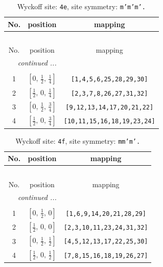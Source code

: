 \documentclass[fleqn,8pt]{jsarticle}
\begin{document}
\begin{longtable}{ccc}
\caption{Wyckoff site: {\tt 4e}, site symmetry: {\tt m'm'm'.}}
 \\
 \hline \hline
No. & position & mapping \\ \hline \endfirsthead

\multicolumn{2}{l}{\tablename\ \thetable{}} \\
 \hline \hline
No. & position & mapping \\ \hline \endhead

 \hline \hline
\multicolumn{2}{r}{\footnotesize\it continued ...} \\ \endfoot

 \hline \hline
\multicolumn{2}{r}{} \\ \endlastfoot

1 & $\left[ 0,\, \frac{1}{2},\, \frac{1}{4} \right]$ & {\tt [1,4,5,6,25,28,29,30]} \\ \hline
2 & $\left[ \frac{1}{2},\, 0,\, \frac{1}{4} \right]$ & {\tt [2,3,7,8,26,27,31,32]} \\ \hline
3 & $\left[ 0,\, \frac{1}{2},\, \frac{3}{4} \right]$ & {\tt [9,12,13,14,17,20,21,22]} \\ \hline
4 & $\left[ \frac{1}{2},\, 0,\, \frac{3}{4} \right]$ & {\tt [10,11,15,16,18,19,23,24]} \\
\end{longtable}
\renewcommand{\arraystretch}{1.2}
\begin{longtable}{ccc}
\caption{Wyckoff site: {\tt 4f}, site symmetry: {\tt mm'm'.}}
 \\
 \hline \hline
No. & position & mapping \\ \hline \endfirsthead

\multicolumn{2}{l}{\tablename\ \thetable{}} \\
 \hline \hline
No. & position & mapping \\ \hline \endhead

 \hline \hline
\multicolumn{2}{r}{\footnotesize\it continued ...} \\ \endfoot

 \hline \hline
\multicolumn{2}{r}{} \\ \endlastfoot

1 & $\left[ 0,\, \frac{1}{2},\, 0 \right]$ & {\tt [1,6,9,14,20,21,28,29]} \\ \hline
2 & $\left[ \frac{1}{2},\, 0,\, 0 \right]$ & {\tt [2,3,10,11,23,24,31,32]} \\ \hline
3 & $\left[ 0,\, \frac{1}{2},\, \frac{1}{2} \right]$ & {\tt [4,5,12,13,17,22,25,30]} \\ \hline
4 & $\left[ \frac{1}{2},\, 0,\, \frac{1}{2} \right]$ & {\tt [7,8,15,16,18,19,26,27]} \\
\end{longtable}
\end{document}
